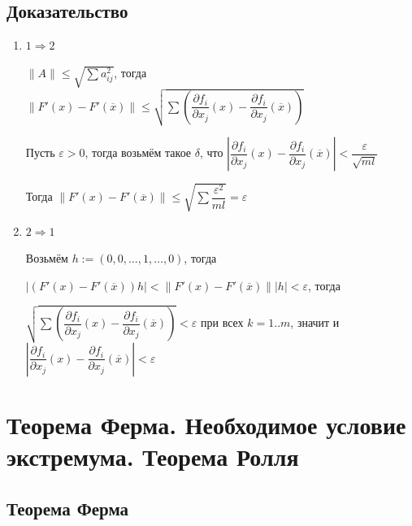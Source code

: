 \documentclass{article}
\begin{document}
        \subsection{Доказательство}
        
            \begin{enumerate}
            
                \item $1 \Rightarrow 2$
                
                    $\| A \| \leq \sqrt{\sum{a^2_{ij}}}$, тогда $\| F'(x) - F'(\overline{x}) \| \leq \sqrt{\sum \left( \dfrac{\partial f_i}{\partial x_j} (x) - \dfrac{\partial f_i}{\partial x_j} (\overline{x}) \right)}$
                    
                    Пусть $\varepsilon > 0$, тогда возьмём такое $\delta$, что $\left| \dfrac{\partial f_i}{\partial x_j} (x) - \dfrac{\partial f_i}{\partial x_j} (\overline{x}) \right| < \dfrac{\varepsilon}{\sqrt{ml}}$
                    
                    Тогда $\|F'(x) - F'(\overline{x}) \| \leq \sqrt{\sum \dfrac{\varepsilon^2}{ml}} = \varepsilon$
                    
                \item $2 \Rightarrow 1$
                
                    Возьмём $h := (0, 0, \ldots, 1, \ldots, 0)$, тогда
                    
                    $| (F'(x) - F'(\overline{x})) h | < \| F'(x) - F'(\overline{x}) \| |h| < \varepsilon$, тогда
                    
                    $\sqrt{\sum \left( \dfrac{\partial f_i}{\partial x_j} (x) - \dfrac{\partial f_i}{\partial x_j} (\overline{x}) \right)} < \varepsilon$ при всех $k = 1..m$, значит и $\left| \dfrac{\partial f_i}{\partial x_j} (x) - \dfrac{\partial f_i}{\partial x_j} (\overline{x}) \right| < \varepsilon$
                    
            \end{enumerate}
            
    \newpage
        
    \section{Теорема Ферма. Необходимое условие экстремума. Теорема Ролля}
    
        \subsection{Теорема Ферма}
        
\end{document}
